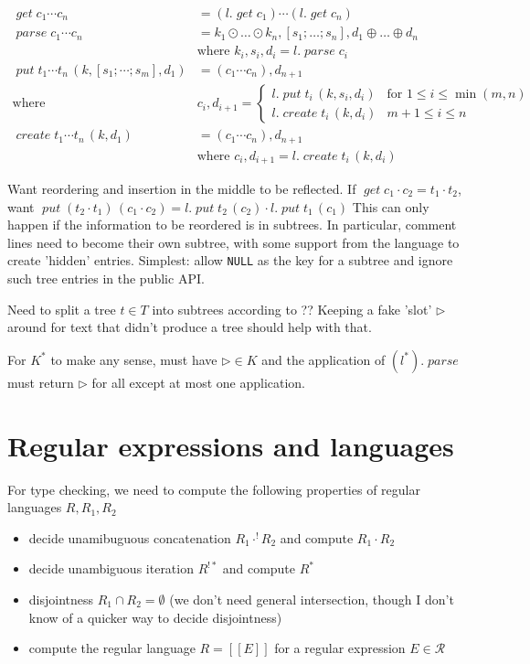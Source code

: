 \documentclass[12pt,fleqn]{amsart}
\newcommand{\ensmath}[1]{\ensuremath{#1}\xspace}
\newcommand{\opnam}[1]{\ensmath{\operatorname{\mathit{#1}}}}
\newcommand{\nparse}{\opnam{parse}}
\newcommand{\lget}[1]{\opnam{get}{#1}}
\newcommand{\lparse}[1]{\nparse{#1}}
\newcommand{\lput}[2]{\opnam{put}{#1}\,{(#2)}}
\newcommand{\lcreate}[2]{\opnam{create}{#1}\,{(#2)}}
\newcommand{\Regexp}{\ensmath{\mathcal R}}
\newcommand{\reglang}[1]{\ensmath{[\![{#1}]\!]}}
\newcommand{\conc}[2]{\ensmath{#1\cdot #2}}
\newcommand{\uaconc}[2]{\ensmath{#1\cdot^{!} #2}}
\newcommand{\uastar}[1]{\ensmath{#1^{!*}}}
\begin{document}
\begin{align*}
  \lget{c_1\cdots c_n} &= (l.\lget{c_1}) \cdots (l.\lget{c_n})\\
  \lparse{c_1\cdots c_n} &= k_1\odot\ldots\odot k_n, [s_1;\ldots;s_n],
                            d_1\oplus\ldots\oplus d_n\\
                            & \text{where } k_i,s_i,d_i = l.\lparse{c_i}\\
  \lput{t_1\cdots t_n}{k, [s_1;\cdots;s_m], d_1} &= (c_1 \cdots c_n), d_{n+1}\\
  \text{where } &c_i, d_{i+1} =
    \begin{cases}
      l.\lput{t_i}{k, s_i, d_i} & \text{for } 1 \leq i \leq \min(m,n)\\
      l.\lcreate{t_i}{k, d_i} & m+1 \leq i \leq n
    \end{cases}\\
  \lcreate{t_1 \cdots t_n}{k, d_1} &= (c_1\cdots c_n), d_{n+1}\\
  & \text{where } c_i, d_{i+1} = l.\lcreate{t_i}{k, d_i}
\end{align*}

Want reordering and insertion in the middle to be reflected. If
$\lget{\conc{c_1}{c_2}} = \conc{t_1}{t_2}$, want
$\lput{(\conc{t_2}{t_1})}{\conc{c_1}{c_2}} =
\conc{l.\lput{t_2}{c_2}}{l.\lput{t_1}{c_1}}$ This can only happen if the
information to be reordered is in subtrees. In particular, comment lines
need to become their own subtree, with some support from the language to
create 'hidden' entries. Simplest: allow {\tt NULL} as the key for a
subtree and ignore such tree entries in the public API.

Need to split a tree $t\in T$ into subtrees according to ?? Keeping a fake
'slot' $\rhd$ around for text that didn't produce a tree should help with
that.

For $K^*$ to make any sense, must have $\rhd\in K$ and the application of
$(l^*).\nparse$ must return $\rhd$ for all except at most one application.

\section{Regular expressions and languages}

For type checking, we need to compute the following properties of regular
languages $R, R_1, R_2$
\begin{itemize}
\item decide unamibuguous concatenation $\uaconc{R_1}{R_2}$ and compute
  $\conc{R_1}{R_2}$
\item decide unambiguous iteration $\uastar{R}$ and compute $R^*$
\item disjointness $R_1 \cap R_2 = \emptyset$ (we don't need general
  intersection, though I don't know of a quicker way to decide
  disjointness)
\item compute the regular language $R = \reglang{E}$ for a regular
  expression $E\in\Regexp$
\end{itemize}
\end{document}
